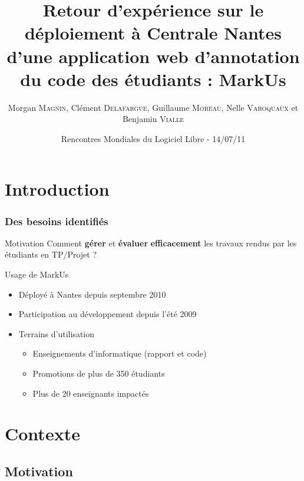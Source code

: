 \documentclass[hyperref,french,usenames,xcolor=dvipsnames]{beamer}
\title[REX MarkUs]%
{Retour d’expérience sur le déploiement à Centrale Nantes d’une application web d’annotation du code des étudiants : MarkUs}
\author[C. \textsc{Delafargue}, M. \textsc{Magnin}, G. \textsc{Moreau}, N. \textsc{Varoquaux}, B. \textsc{Vialle}]%
{Morgan \textsc{Magnin}, Clément \textsc{Delafargue}, Guillaume \textsc{Moreau}, Nelle \textsc{Varoquaux} et Benjamin \textsc{Vialle}
}
\institute[ECN]{
\structure{
École Centrale de Nantes}
}
\date[14/07/2011]{Rencontres Mondiales du Logiciel Libre - 14/07/11}
\begin{document}
\frame{\titlepage}


\section{Introduction}

\frame
{
  \frametitle{Des besoins identifiés}

\begin{alertblock}{Motivation}
Comment \textbf{gérer} et \textbf{évaluer} \textbf{efficacement} les travaux rendus par les étudiants en TP/Projet ?
\end{alertblock}

\begin{block}{Usage de MarkUs}
\begin{itemize}
\item Déployé à Nantes depuis septembre 2010
\item Participation au développement depuis l'été 2009
\item Terrains d'utilisation
\begin{itemize}
\item Enseignements d'informatique (rapport et code)
\item Promotions de plus de 350 étudiants
\item Plus de 20 enseignants impactés
\end{itemize}
\end{itemize}
\end{block}
}

\section{Contexte}

\subsection*{Motivation}
\end{document}
